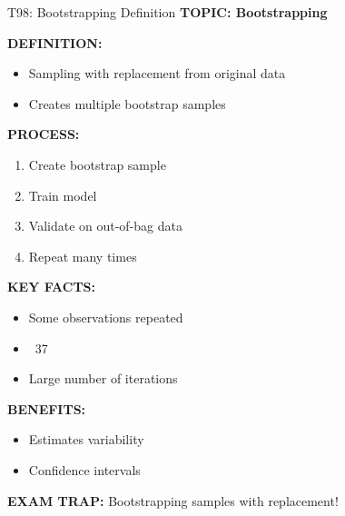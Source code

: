 \documentclass[8pt]{beamer}
\begin{document}
	\begin{frame}{T98: Bootstrapping Definition}
		\fontsize{6.5}{7.5}\selectfont
		\textbf{TOPIC: Bootstrapping}
		
		\vspace{0.1cm}
		\textbf{DEFINITION:}
		\begin{itemize}
			\item Sampling with replacement from original data
			\item Creates multiple bootstrap samples
		\end{itemize}
		
		\vspace{0.1cm}
		\textbf{PROCESS:}
		\begin{enumerate}
			\item Create bootstrap sample
			\item Train model
			\item Validate on out-of-bag data
			\item Repeat many times
		\end{enumerate}
		
		\vspace{0.1cm}
		\textbf{KEY FACTS:}
		\begin{itemize}
			\item Some observations repeated
			\item ~37%
			\item Large number of iterations
		\end{itemize}
		
		\vspace{0.1cm}
		\textbf{BENEFITS:}
		\begin{itemize}
			\item Estimates variability
			\item Confidence intervals
		\end{itemize}
		
		\textcolor{myred}{\textbf{EXAM TRAP:}} Bootstrapping samples \textcolor{myblue}{with replacement}!
	\end{frame}
	
\end{document}

